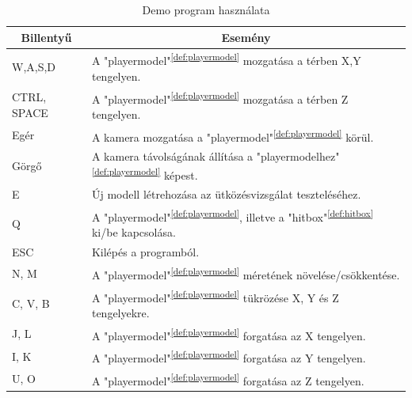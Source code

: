 \begin{table}[h]
	\centering
	\begin{tabular}{|l|l|}
		\hline
		\multicolumn{1}{|c|}{\textbf{Billentyű}} & \multicolumn{1}{c|}{\textbf{Esemény}}\\
		\hline
		W,A,S,D & {A "playermodel"\textsuperscript{\ref{def:playermodel}} mozgatása a térben X,Y tengelyen.} \\\hline
		CTRL, SPACE & A "playermodel"\textsuperscript{\ref{def:playermodel}} mozgatása a térben Z tengelyen. \\\hline
		Egér & A kamera mozgatása a "playermodel"\textsuperscript{\ref{def:playermodel}} körül. \\\hline
		Görgő & A kamera távolságának állítása a "playermodelhez"\textsuperscript{\ref{def:playermodel}} képest. \\\hline
		E & Új modell létrehozása az ütközésvizsgálat teszteléséhez. \\\hline
		Q & A "playermodel"\textsuperscript{\ref{def:playermodel}}, illetve a "hitbox"\textsuperscript{\ref{def:hitbox}} ki/be kapcsolása. \\\hline
		ESC & Kilépés a programból. \\\hline
		N, M & A "playermodel"\textsuperscript{\ref{def:playermodel}} méretének növelése/csökkentése. \\\hline
		C, V, B & A "playermodel"\textsuperscript{\ref{def:playermodel}} tükrözése X, Y és Z tengelyekre. \\\hline
		J, L & A "playermodel"\textsuperscript{\ref{def:playermodel}} forgatása az X tengelyen. \\\hline
		I, K & A "playermodel"\textsuperscript{\ref{def:playermodel}} forgatása az Y tengelyen. \\\hline
		U, O & A "playermodel"\textsuperscript{\ref{def:playermodel}} forgatása az Z tengelyen. \\\hline
	\end{tabular}
	\caption{Demo program használata}
	\label{tab:demo}
\end{table}

\newpage